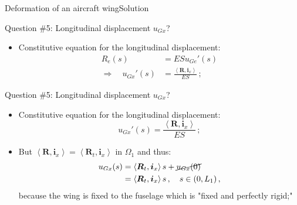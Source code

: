 \documentclass{beamer}
\newcommand{\imply}{\Rightarrow}
\newcommand{\uj}{u}
\newcommand{\xj}{x}
\renewcommand{\ij}{i}
\newcommand{\iv}{{\boldsymbol\ij}}
\newcommand{\medium}{\Omega}
\newcommand{\Fresj}{R}
\newcommand{\Fres}{{\boldsymbol\Fresj}}
\newcommand{\scal}[1]{\left\langle{#1}\right\rangle}
\begin{document}
\begin{frame}{Deformation of an aircraft wing}{Solution}

\begin{overprint}

\vskip-20pt
\begin{exampleblock}{Question \#5: Longitudinal displacement $\uj_{G\xj}$?}
\begin{itemize}
\item Constitutive equation for the longitudinal displacement:
\begin{displaymath}
\begin{split}
\Fresj_e(s) &=ES\uj_{Ge}'(s) \\
\imply\quad\uj_{G\xj}'(s) &=\frac{\scal{\Fres,\iv_\xj}}{ES}\,;
\end{split}
\end{displaymath}
\end{itemize}
\end{exampleblock}

\vskip-20pt
\begin{exampleblock}{Question \#5: Longitudinal displacement $\uj_{G\xj}$?}
\begin{itemize}
\item Constitutive equation for the longitudinal displacement:
\begin{displaymath}
\uj_{G\xj}'(s) =\frac{\scal{\Fres,\iv_\xj}}{ES}\,;
\end{displaymath}
\item But $\scal{\Fres,\iv_\xj}=\scal{\Fres_t,\iv_\xj}$ in $\medium_1$ and thus:
\begin{displaymath}
\begin{split}
\uj_{G\xj}(s) &=\scal{\Fres_t,\iv_\xj}s+\cancel{\uj_{G\xj}(0)} \\
&=\scal{\Fres_t,\iv_\xj}s\,,\quad s\in(0,L_1)\,,
\end{split}
\end{displaymath}
because the wing is fixed to the fuselage which is "fixed and perfectly rigid;" 
\end{itemize}
\end{exampleblock}


\end{overprint}
\end{frame}
\end{document}
